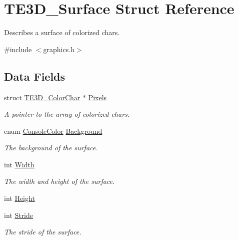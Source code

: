 \hypertarget{struct_t_e3_d___surface}{\section{T\-E3\-D\-\_\-\-Surface Struct Reference}
\label{struct_t_e3_d___surface}
}


Describes a surface of colorized chars.  




{\ttfamily \#include $<$graphics.\-h$>$}

\subsection*{Data Fields}
\begin{DoxyCompactItemize}
\item 
struct \hyperlink{struct_t_e3_d___color_char}{T\-E3\-D\-\_\-\-Color\-Char} $\ast$ \hyperlink{struct_t_e3_d___surface_a9f3c0fd0d0a5be99cb36f5995864cf63}{Pixels}
\begin{DoxyCompactList}\small\item\em A pointer to the array of colorized chars. \end{DoxyCompactList}\item 
enum \hyperlink{console_8h_a821042d5f30537f776ce823c5d66aada}{Console\-Color} \hyperlink{struct_t_e3_d___surface_aa0033422d8fc4f65a5397d699edb0719}{Background}
\begin{DoxyCompactList}\small\item\em The background of the surface. \end{DoxyCompactList}\item 
int \hyperlink{struct_t_e3_d___surface_abbe7749c3b402f7dfe64f936774cfcd4}{Width}
\begin{DoxyCompactList}\small\item\em The width and height of the surface. \end{DoxyCompactList}\item 
int \hyperlink{struct_t_e3_d___surface_aaadefba794062a2ca7e58ceb10b955a1}{Height}
\item 
int \hyperlink{struct_t_e3_d___surface_a2bc9777201b278cf5e84e9124ffbba71}{Stride}
\begin{DoxyCompactList}\small\item\em The stride of the surface. \end{DoxyCompactList}\end{DoxyCompactItemize}


